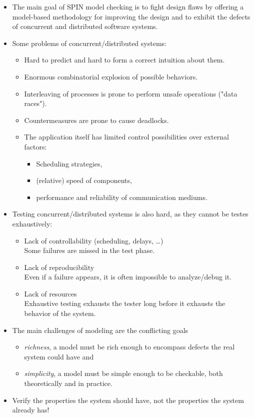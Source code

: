 	\begin{itemize}
		\item The main goal of SPIN model checking is to fight design flaws by offering a model-based methodology for improving the design and to exhibit the defects of concurrent and distributed software systems.
		\item Some problems of concurrent/distributed systems:
			\begin{itemize}
				\item Hard to predict and hard to form a correct intuition about them.
				\item Enormous combinatorial explosion of possible behaviors.
				\item Interleaving of processes is prone to perform unsafe operations ("data races").
				\item Countermeasures are prone to cause deadlocks.
				\item The application itself has limited control possibilities over external factors:
					\begin{itemize}
						\item Scheduling strategies,
						\item (relative) speed of components,
						\item performance and reliability of communication mediums.
					\end{itemize}
			\end{itemize}
		\item Testing concurrent/distributed systems is also hard, as they cannot be testes exhaustively:
			\begin{itemize}
				\item Lack of controllability (scheduling, delays, \dots) \\
				Some failures are missed in the test phase.
				\item Lack of reproducibility \\
				Even if a failure appears, it is often impossible to analyze/debug it.
				\item Lack of resources \\
				Exhaustive testing exhausts the tester long before it exhausts the behavior of the system.
			\end{itemize}
		\item The main challenges of modeling are the conflicting goals
			\begin{itemize}
				\item \textit{richness}, a model must be rich enough to encompass defects the real system could have and
				\item \textit{simplicity}, a model must be simple enough to be checkable, both theoretically and in practice.
			\end{itemize}
		\item Verify the properties the system should have, not the properties the system already has!
	\end{itemize}

